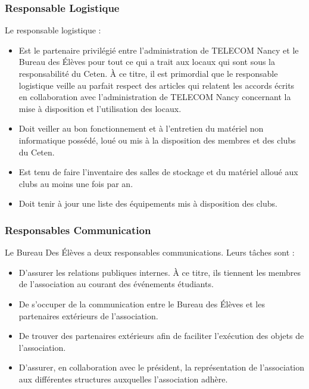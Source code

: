 \documentclass{article} %
\begin{document}
			\subsubsection{Responsable Logistique}

				Le responsable logistique :
				\begin{itemize}
					\item Est le partenaire privilégié entre l’administration de
						TELECOM Nancy et le Bureau des Élèves pour tout ce qui a
						trait aux locaux qui sont sous la responsabilité du
						Ceten. À ce titre, il est primordial que le responsable
						logistique veille au parfait respect des articles qui
						relatent les accords écrits en collaboration avec
						l’administration de TELECOM Nancy concernant la mise à
						disposition et l’utilisation des locaux.
					\item Doit veiller au bon fonctionnement et à l’entretien du
						matériel non informatique possédé, loué ou mis à la
						disposition des membres et des clubs du Ceten.
					\item Est tenu de faire l’inventaire des salles de stockage
						et du matériel alloué aux clubs au moins une fois par
						an.
					\item Doit tenir à jour une liste des équipements mis à
						disposition des clubs.
				\end{itemize}

			\subsubsection{Responsables Communication}

				Le Bureau Des Élèves a deux responsables communications. Leurs
				tâches sont :
				\begin{itemize}
					\item D’assurer les relations publiques internes. À ce
						titre, ils tiennent les membres de l’association au
						courant des événements étudiants.
					\item De s’occuper de la communication entre le Bureau des
						Élèves et les partenaires extérieurs de l’association.
					\item De trouver des partenaires extérieurs afin de
						faciliter l’exécution des objets de l’association.
					\item D’assurer, en collaboration avec le président, la
						représentation de l’association aux différentes
						structures auxquelles l’association adhère. 
				\end{itemize}
\end{document}
